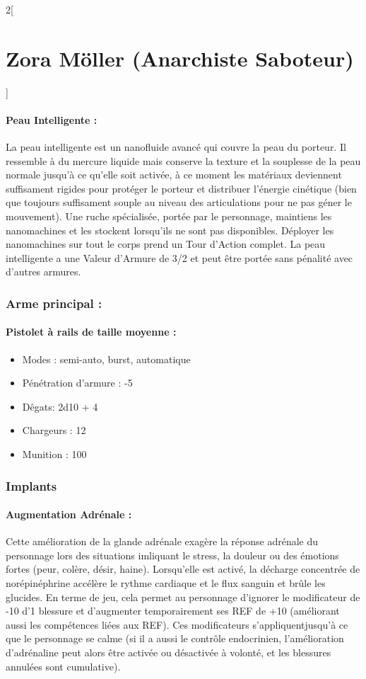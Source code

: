 \documentclass[a4paper,9pt]{article}
\begin{document}
\begin{multicols}{2}[\section*{Zora Möller (Anarchiste Saboteur)}]
   \paragraph{Peau Intelligente :} La peau intelligente est un nanofluide avancé qui
couvre la peau du porteur. Il ressemble à du mercure liquide mais conserve la
texture et la souplesse de la peau normale jusqu'à ce qu'elle soit activée, à
ce moment les matériaux deviennent suffisament rigides pour protéger le porteur
et distribuer l'énergie cinétique (bien que toujours suffisament souple au
niveau des articulations pour ne pas géner le mouvement). Une ruche
spécialisée, portée par le personnage, maintiens les nanomachines et les
stockent lorsqu'ils ne sont pas disponibles. Déployer les nanomachines sur tout
le corps prend un Tour d'Action complet. La peau intelligente a une Valeur
d'Armure de 3/2 et peut être portée sans pénalité avec d'autres armures.

\subsubsection*{Arme principal :}
\paragraph{Pistolet à rails de taille moyenne :}
\begin{itemize}
   \item Modes : semi-auto, burst, automatique
   \item Pénétration d'armure : -5
   \item Dêgats: 2d10 + 4
   \item Chargeurs : 12
   \item Munition : 100
\end{itemize}

\subsubsection*{Implants}

\paragraph{Augmentation Adrénale :} Cette amélioration de la glande adrénale
exagère la réponse adrénale du personnage lors des situations imliquant le
stress, la douleur ou des émotions fortes (peur, colère, désir, haine).
Lorsqu'elle est activé, la décharge concentrée de norépinéphrine accélère le
rythme cardiaque et le flux sanguin et brûle les glucides. En terme de jeu,
cela permet au personnage d'ignorer le modificateur de -10 d'1 blessure et
d'augmenter temporairement ses REF de +10 (améliorant aussi les compétences
liées aux REF). Ces modificateurs s'appliquentjusqu'à ce que le personnage se
calme (si il a aussi le contrôle endocrinien, l'amélioration d'adrénaline peut
alors être activée ou désactivée à volonté, et les blessures annulées sont
cumulative).


\end{multicols}
\end{document}
